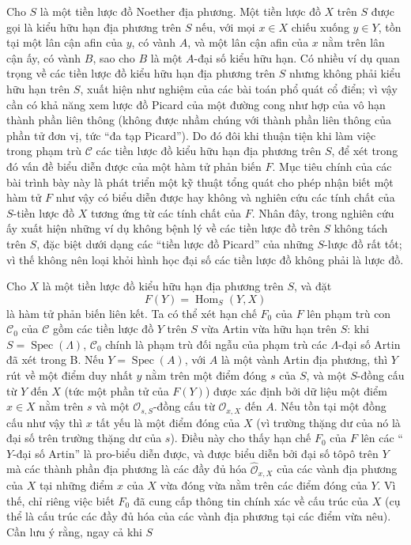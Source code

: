 \documentclass[11pt,twoside,openany]{book}
\numberwithin{equation}{section}
\newcommand{\src}[1]{%
  \phantomsection\hypertarget{src:\fgasourceid:#1}{}%
  \marginpar{\raggedleft\footnotesize\sffamily #1}%
}
\newcommand{\fgasourceid}{unset}
\begin{document}
Cho $S$ là một tiền lược đồ Noether địa phương. Một tiền lược đồ $X$ trên
$S$ được gọi là \src{379}kiểu hữu hạn địa phương trên $S$ nếu, với mọi
$x\in X$ chiếu xuống $y\in Y$, tồn tại một lân cận afin của $y$, có vành $A$,
và một lân cận afin của $x$ nằm trên lân cận ấy, có vành $B$, sao cho $B$ là
một $A$-đại số kiểu hữu hạn. Có nhiều ví dụ quan trọng về các tiền lược đồ kiểu
hữu hạn địa phương trên $S$ nhưng không phải kiểu hữu hạn trên $S$, xuất hiện
như nghiệm của các bài toán phổ quát cổ điển; vì vậy cần có khả năng xem lược
đồ Picard của một đường cong như hợp của vô hạn thành phần liên thông (không
được nhầm chúng với thành phần liên thông của phần tử đơn vị, tức ``đa tạp
Picard''). Do đó đôi khi thuận tiện khi làm việc trong phạm trù $\mathcal C$
các tiền lược đồ kiểu hữu hạn địa phương trên $S$, để xét trong đó vấn đề biểu
diễn được của một hàm tử phản biến $F$. Mục tiêu chính của các bài trình bày
này là phát triển một kỹ thuật tổng quát cho phép nhận biết một hàm tử $F$ như
vậy có biểu diễn được hay không và nghiên cứu các tính chất của $S$-tiền lược
đồ $X$ tương ứng từ các tính chất của $F$. Nhân đây, trong nghiên cứu ấy xuất
hiện những ví dụ không bệnh lý về các tiền lược đồ trên $S$ không tách trên
$S$, đặc biệt dưới dạng các ``tiền lược đồ Picard'' của những $S$-lược đồ rất
tốt; vì thế không nên loại khỏi hình học đại số các tiền lược đồ không phải là
lược đồ.

Cho $X$ là một tiền lược đồ kiểu hữu hạn địa phương trên $S$, và đặt
\[
  F(Y)=\operatorname{Hom}_S(Y,X)
\]
là hàm tử phản biến liên kết. Ta có thể xét hạn chế $F_0$ của $F$ lên phạm trù
con $\mathcal C_0$ của $\mathcal C$ gồm các tiền lược đồ $Y$ trên $S$ vừa
Artin vừa hữu hạn trên $S$: khi $S=\operatorname{Spec}(\Lambda)$,
$\mathcal C_0$ chính là phạm trù đối ngẫu của phạm trù các $\Lambda$-đại số
Artin đã xét trong B. Nếu $Y=\operatorname{Spec}(A)$, với $A$ là một vành
Artin địa phương, thì $Y$ rút về một điểm duy nhất $y$ nằm trên một điểm đóng
$s$ của $S$, và một $S$-đồng cấu từ $Y$ đến $X$ (tức một phần tử của $F(Y)$)
được xác định bởi dữ liệu một điểm $x\in X$ nằm trên $s$ và một
$\mathcal O_{s,S}$-đồng cấu từ $\mathcal O_{x,X}$ đến $A$. Nếu tồn tại một
đồng cấu như vậy thì $x$ tất yếu là một điểm đóng của $X$ (vì trường thặng dư
của nó là đại số trên trường thặng dư của $s$). Điều này cho thấy hạn chế
$F_0$ của $F$ lên các ``$Y$-đại số Artin'' là pro-biểu diễn được, và được biểu
diễn bởi đại số tôpô trên $Y$ mà các thành phần địa phương là các đầy đủ hóa
$\widehat{\mathcal O}_{x,X}$ của các vành địa phương của $X$ tại những điểm
$x$ của $X$ vừa đóng vừa nằm trên các điểm đóng của $Y$. Vì thế, chỉ riêng
việc biết $F_0$ đã cung cấp thông tin chính xác về cấu trúc của $X$ (cụ thể là
cấu trúc các đầy đủ hóa của các vành địa phương tại các điểm vừa nêu). Cần lưu
ý rằng, ngay cả khi $S$
\end{document}
